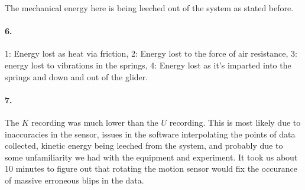     The mechanical energy here is being leeched out of the system as stated before.

    \paragraph*{6.}

    1: Energy lost as heat via friction, 2: Energy lost to the force of air resistance, 3: energy lost to vibrations in the springs, 4: Energy lost as it's imparted into the springs and down and out of the glider.

    \paragraph*{7.}

    The $K$ recording was much lower than the $U$ recording. This is most likely due to inaccuracies in the sensor, issues in the software interpolating the points of data collected, kinetic energy being leeched from the system, and probably due to some unfamiliarity we had with the equipment and experiment. It took us about 10 minutes to figure out that rotating the motion sensor would fix the occurance of massive erroneous blips in the data.


